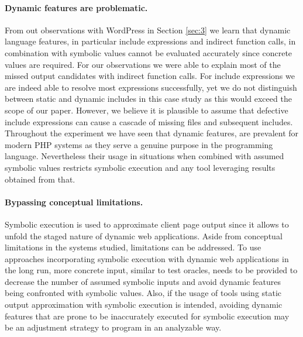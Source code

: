 \documentclass[sigconf]{acmart}
\renewcommand{\sf}[1]{\textsf{#1}}
\begin{document}
\paragraph{Dynamic features are problematic.}
From out observations with \sf{WordPress} in Section \ref{sec:3} we learn that
dynamic language features, in particular include expressions and indirect function
calls, in combination with symbolic values cannot be evaluated accurately since
concrete values are required. For our observations we were able to explain most
of the missed output candidates with indirect function calls. For include
expressions we are indeed able to resolve most expressions successfully, yet we
do not distinguish between static and dynamic includes in this case study as
this would exceed the scope of our paper. However, we believe it is plausible
to assume that defective include expressions can cause a cascade of missing
files and subsequent includes.
Throughout the experiment we have seen that dynamic features, are prevalent for
modern PHP systems as they serve a genuine purpose in the programming language.
Nevertheless their usage in situations when combined with assumed symbolic
values restricts symbolic execution and any tool leveraging results obtained
from that.

\paragraph{Bypassing conceptual limitations.}
Symbolic execution is used to approximate client page output since it allows to
unfold the staged nature of dynamic web applications. Aside from conceptual
limitations in the systems studied, limitations can be addressed. To use
approaches incorporating symbolic execution with dynamic web applications in
the long run, more concrete input, similar to test oracles, needs
to be provided to decrease the number of assumed symbolic inputs and avoid
dynamic features being confronted with symbolic values. Also, if the usage of
tools using static output approximation with symbolic execution is intended,
avoiding dynamic features that are prone to be inaccurately executed for
symbolic execution  may be an adjustment strategy to program in an analyzable
way. 
\end{document}
